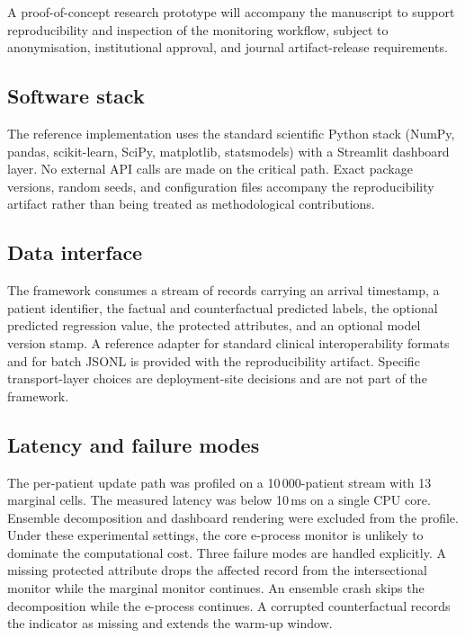 \documentclass[acmsmall,nonacm,review,anonymous]{acmart}
\newcommand{\1}[1]{\mathbf{1}\!\left\{#1\right\}}
\begin{document}
A proof-of-concept research prototype will accompany the manuscript to support reproducibility and inspection of the monitoring workflow, subject to anonymisation, institutional approval, and journal artifact-release requirements.

\subsection{Software stack}

The reference implementation uses the standard scientific Python stack (NumPy, pandas, scikit-learn, SciPy, matplotlib, statsmodels) with a Streamlit dashboard layer. No external API calls are made on the critical path. Exact package versions, random seeds, and configuration files accompany the reproducibility artifact rather than being treated as methodological contributions.

\subsection{Data interface}

The framework consumes a stream of records carrying an arrival timestamp, a patient identifier, the factual and counterfactual predicted labels, the optional predicted regression value, the protected attributes, and an optional model version stamp. A reference adapter for standard clinical interoperability formats and for batch JSONL is provided with the reproducibility artifact. Specific transport-layer choices are deployment-site decisions and are not part of the framework.

\subsection{Latency and failure modes}

The per-patient update path was profiled on a 10\,000-patient stream with 13 marginal cells. The measured latency was below 10\,ms on a single CPU core. Ensemble decomposition and dashboard rendering were excluded from the profile. Under these experimental settings, the core e-process monitor is unlikely to dominate the computational cost. Three failure modes are handled explicitly. A missing protected attribute drops the affected record from the intersectional monitor while the marginal monitor continues. An ensemble crash skips the decomposition while the e-process continues. A corrupted counterfactual records the indicator as missing and extends the warm-up window.
\end{document}
